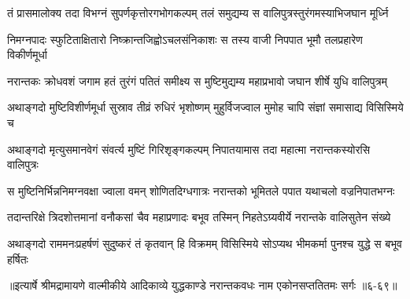\twolineshloka
{तं प्रासमालोक्य तदा विभग्नं सुपर्णकृत्तोरगभोगकल्पम्}
{तलं समुद्यम्य स वालिपुत्रस्तुरंगमस्याभिजघान मूर्ध्नि} %

\twolineshloka
{निमग्नपादः स्फुटिताक्षितारो निष्क्रान्तजिह्वोऽचलसंनिकाशः}
{स तस्य वाजी निपपात भूमौ तलप्रहारेण विकीर्णमूर्धा} %

\twolineshloka
{नरान्तकः क्रोधवशं जगाम हतं तुरंगं पतितं समीक्ष्य}
{स मुष्टिमुद्यम्य महाप्रभावो जघान शीर्षे युधि वालिपुत्रम्} %

\twolineshloka
{अथाङ्गदो मुष्टिविशीर्णमूर्धा सुस्राव तीव्रं रुधिरं भृशोष्णम्}
{मुहुर्विजज्वाल मुमोह चापि संज्ञां समासाद्य विसिस्मिये च} %

\twolineshloka
{अथाङ्गदो मृत्युसमानवेगं संवर्त्य मुष्टिं गिरिशृङ्गकल्पम्}
{निपातयामास तदा महात्मा नरान्तकस्योरसि वालिपुत्रः} %

\twolineshloka
{स मुष्टिनिर्भिन्ननिमग्नवक्षा ज्वाला वमन् शोणितदिग्धगात्रः}
{नरान्तको भूमितले पपात यथाचलो वज्रनिपातभग्नः} %

\twolineshloka
{तदान्तरिक्षे त्रिदशोत्तमानां वनौकसां चैव महाप्रणादः}
{बभूव तस्मिन् निहतेऽग्र्यवीर्ये नरान्तके वालिसुतेन संख्ये} %

\twolineshloka
{अथाङ्गदो राममनःप्रहर्षणं सुदुष्करं तं कृतवान् हि विक्रमम्}
{विसिस्मिये सोऽप्यथ भीमकर्मा पुनश्च युद्धे स बभूव हर्षितः} %


॥इत्यार्षे श्रीमद्रामायणे वाल्मीकीये आदिकाव्ये युद्धकाण्डे नरान्तकवधः नाम एकोनसप्ततितमः सर्गः ॥६-६९॥
